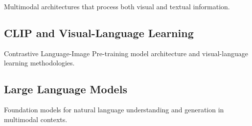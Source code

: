 Multimodal architectures that process both visual and textual information.

\subsection{CLIP and Visual-Language Learning}

Contrastive Language-Image Pre-training model architecture and visual-language learning methodologies.

\subsection{Large Language Models}

Foundation models for natural language understanding and generation in multimodal contexts.
